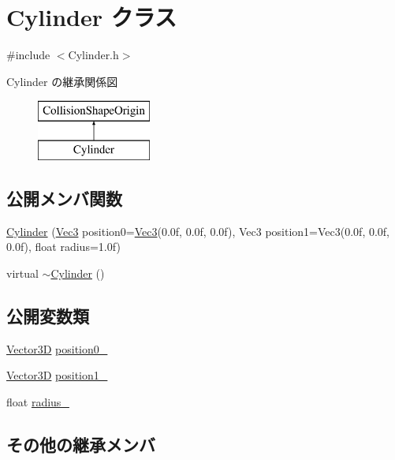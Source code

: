 \hypertarget{class_cylinder}{}\section{Cylinder クラス}
\label{class_cylinder}


{\ttfamily \#include $<$Cylinder.\+h$>$}

Cylinder の継承関係図\begin{figure}[H]
\begin{center}
\leavevmode
\includegraphics[height=2.000000cm]{class_cylinder}
\end{center}
\end{figure}
\subsection*{公開メンバ関数}
\begin{DoxyCompactItemize}
\item 
\mbox{\hyperlink{class_cylinder_a642d2ea21539b8a35ed8c79f36615f6f}{Cylinder}} (\mbox{\hyperlink{_vector3_d_8h_ab16f59e4393f29a01ec8b9bbbabbe65d}{Vec3}} position0=\mbox{\hyperlink{_vector3_d_8h_ab16f59e4393f29a01ec8b9bbbabbe65d}{Vec3}}(0.\+0f, 0.\+0f, 0.\+0f), Vec3 position1=\+Vec3(0.\+0f, 0.\+0f, 0.\+0f), float radius=1.\+0f)
\item 
virtual \mbox{\hyperlink{class_cylinder_a05ab556f0ae3cd6e99d9d1f3caca80b3}{$\sim$\+Cylinder}} ()
\end{DoxyCompactItemize}
\subsection*{公開変数類}
\begin{DoxyCompactItemize}
\item 
\mbox{\hyperlink{class_vector3_d}{Vector3D}} \mbox{\hyperlink{class_cylinder_ade5211259c6543ae77c4707b1ec26538}{position0\+\_\+}}
\item 
\mbox{\hyperlink{class_vector3_d}{Vector3D}} \mbox{\hyperlink{class_cylinder_ada317510ac188ea639a0f8613c2b554e}{position1\+\_\+}}
\item 
float \mbox{\hyperlink{class_cylinder_abba752e07b11b7bfd8fcce64a6d9b678}{radius\+\_\+}}
\end{DoxyCompactItemize}
\subsection*{その他の継承メンバ}


